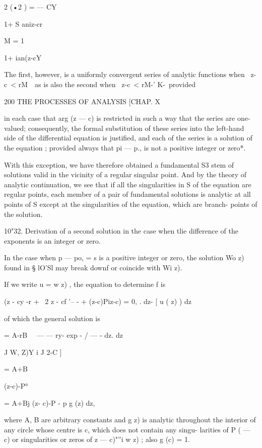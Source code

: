  2 (•2 ) = — CY



1+ S aniz-cr

M = 1

1+ ian(z-cY



The first, however, is a uniformly convergent series of analytic
functions when \ z-c\ < rM~\ as is also the second when \ z-c\ < rM-'
K-\ provided



200 THE PROCESSES OF ANALYSIS [CHAP. X

in each case that arg (z — c) is restricted in such a way that the
series are one-valued; consequently, the formal substitution of these
series into the left-hand side of the differential equation is
justified, and each of the series is a solution of the equation ;
provided always that pi — p., is not a positive integer or zero*.

With this exception, we have therefore obtained a fundamental S3 stem
of solutions valid in the vicinity of a regular singular point. And by
the theory of analytic continuation, we see that if all the
singularities in S of the equation are regular points, each member of
a pair of fundamental solutions is analytic at all points of S except
at the singularities of the equation, which are branch- points of the
solution.

10"32. Derivation of a second solution in the case when tlie
difference of the exponents is an integer or zero.

In the case when p — po, = s is a positive integer or zero, the
solution Wo z) found in § lO'Sl may break downf or coincide with Wi
z).

If we write u = w z) , the equation to determine f is

(z - cy -r + \ 2 z - cf '-- - + (z-c)Piz-c) = 0, . dz- [ u ( z) ) dz

of which the general solution is

 = A-rB\ ~ — — ry- exp - / — - dz. dz

J W, Z)Y i J 2-C ]



= A+B



(z-c)-P°



= A+Bj (z- c)-P - p g (z) dz,



where A, B are arbitrary constants and g z) is analytic throughout the
interior of any circle whose centre is c, which does not contain any
singu- larities of P ( — c) or singularities or zeros of z — c)"''i w
z) ; also g (c) = 1.

